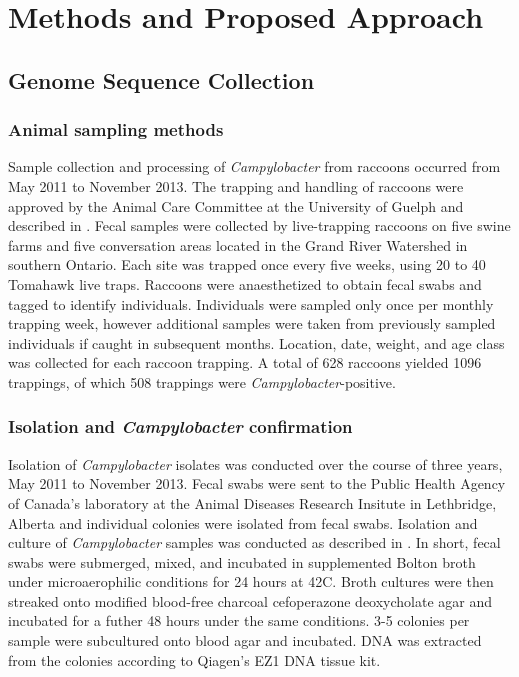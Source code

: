 \documentclass[letterpaper,titlepage,12pt]{article}
\begin{document}
\section{Methods and Proposed Approach}

\subsection{Genome Sequence Collection}

\subsubsection{Animal sampling methods}  %
Sample collection and processing of \textit{Campylobacter} from raccoons occurred from May 2011 to November 2013. The trapping and handling of raccoons were approved by the Animal Care Committee at the University of Guelph and described in \cite{bondo2015longitudinal}. Fecal samples were collected by live-trapping raccoons on five swine farms and five conversation areas located in the Grand River Watershed in southern Ontario. Each site was trapped once every five weeks, using 20 to 40 Tomahawk live traps. Raccoons were anaesthetized to obtain fecal swabs and tagged to identify individuals. Individuals were sampled only once per monthly trapping week, however additional samples were taken from previously sampled individuals if caught in subsequent months. Location, date, weight, and age class was collected for each raccoon trapping. A total of 628 raccoons yielded 1096 trappings, of which 508 trappings were \textit{Campylobacter}-positive. 

\subsubsection{Isolation and \textit{Campylobacter} confirmation}

Isolation of \textit{Campylobacter} isolates was conducted over the course of three years, May 2011 to November 2013. Fecal swabs were sent to the Public Health Agency of Canada's laboratory at the Animal Diseases Research Insitute in Lethbridge, Alberta and individual colonies were isolated from fecal swabs. Isolation and culture of \textit{Campylobacter} samples was conducted as described in \cite{mutschall2020campylobacter}. In short, fecal swabs were submerged, mixed, and incubated in supplemented Bolton broth under microaerophilic conditions for 24 hours at 42\textdegree C. Broth cultures were then streaked onto modified blood-free charcoal cefoperazone deoxycholate agar and incubated for a futher 48 hours under the same conditions. 3-5 colonies per sample were subcultured onto blood agar and incubated. DNA was extracted from the colonies according to Qiagen's EZ1 DNA tissue kit. 
\end{document}
